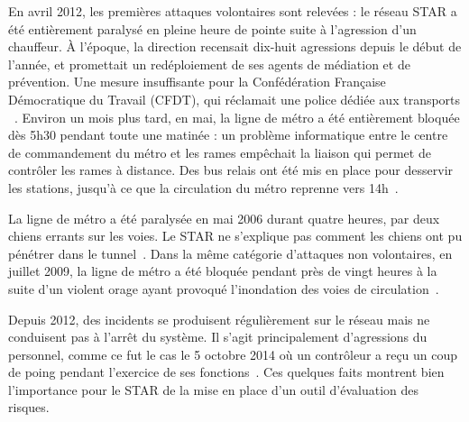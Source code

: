        En avril 2012, les premières attaques volontaires sont relevées : le réseau STAR a été entièrement paralysé en pleine heure de pointe suite à l'agression d'un chauffeur. À l'époque, la direction recensait dix-huit agressions depuis le début de l'année, et promettait un redéploiement de ses agents de médiation et de prévention. Une mesure insuffisante pour la Confédération Française Démocratique du Travail (CFDT), qui réclamait \og une police dédiée aux transports \fg ~\cite{bus_agression}. Environ un mois plus tard, en mai, la ligne de métro a été entièrement bloquée dès 5h30 pendant toute une matinée : un problème informatique entre le centre de commandement du métro et les rames empêchait la liaison qui permet de contrôler les rames à distance. Des bus relais ont été mis en place pour desservir les stations, jusqu'à ce que la circulation du métro reprenne vers 14h~\cite{metro_info}.
        
        La ligne de métro a été paralysée en mai 2006 durant quatre heures, par deux chiens errants sur les voies. Le STAR ne s'explique pas comment les chiens ont pu pénétrer dans le tunnel~\cite{chiens_metro}. Dans la même catégorie d'attaques non volontaires, en juillet 2009, la ligne de métro a été bloquée pendant près de vingt heures à la suite d'un violent orage ayant provoqué l'inondation des voies de circulation~\cite{metro_orage}.
        
        Depuis 2012, des incidents se produisent régulièrement sur le réseau mais ne conduisent pas à l'arrêt du système. Il s'agit principalement d'agressions du personnel, comme ce fut le cas le 5 octobre 2014 où un contrôleur a reçu un coup de poing pendant l'exercice de ses fonctions~\cite{coup_poing_rennes}. Ces quelques faits montrent bien l'importance pour le STAR de la mise en place d'un outil d'évaluation des risques.
